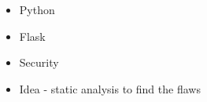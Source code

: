 \begin{itemize}
\item Python
\item Flask
\item Security
\item Idea - static analysis to find the flaws
\end{itemize}
